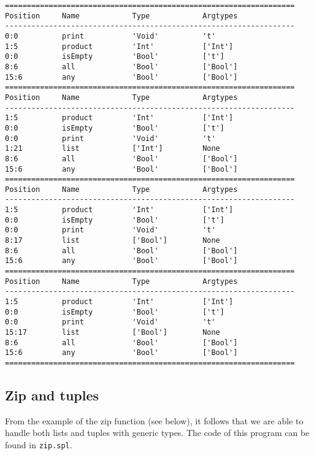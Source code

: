 \documentclass[a4paper]{article}
\begin{document}
\begin{verbatim}
==================================================================
Position     Name            Type            Argtypes            
------------------------------------------------------------------
0:0          print           'Void'          't'                 
1:5          product         'Int'           ['Int']             
0:0          isEmpty         'Bool'          ['t']               
8:6          all             'Bool'          ['Bool']            
15:6         any             'Bool'          ['Bool']            
==================================================================
Position     Name            Type            Argtypes            
------------------------------------------------------------------
1:5          product         'Int'           ['Int']             
0:0          isEmpty         'Bool'          ['t']               
0:0          print           'Void'          't'                 
1:21         list            ['Int']         None                
8:6          all             'Bool'          ['Bool']            
15:6         any             'Bool'          ['Bool']            
==================================================================
Position     Name            Type            Argtypes            
------------------------------------------------------------------
1:5          product         'Int'           ['Int']             
0:0          isEmpty         'Bool'          ['t']               
0:0          print           'Void'          't'                 
8:17         list            ['Bool']        None                
8:6          all             'Bool'          ['Bool']            
15:6         any             'Bool'          ['Bool']            
==================================================================
Position     Name            Type            Argtypes            
------------------------------------------------------------------
1:5          product         'Int'           ['Int']             
0:0          isEmpty         'Bool'          ['t']               
0:0          print           'Void'          't'                 
15:17        list            ['Bool']        None                
8:6          all             'Bool'          ['Bool']            
15:6         any             'Bool'          ['Bool']            
==================================================================
\end{verbatim}

\subsection{Zip and tuples}
From the example of the zip function (see below), it follows that we are able to handle both lists and tuples with generic types. The code of this program can be found in {\tt zip.spl}. 

\end{document}

